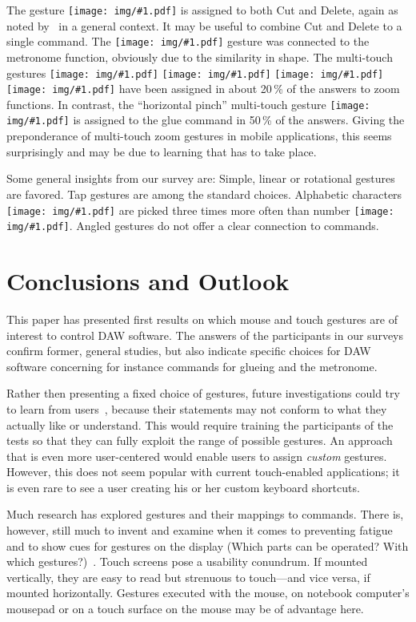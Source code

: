 \documentclass{aes130}
\newcommand{\sixthpic}[1][]{\texttt{[image: img/\#1.pdf]}}
\begin{document}
The gesture \sixthpic[sign-x] is assigned to both Cut and Delete, again as noted by~\cite{Wobbrock:2009:UGS:1518701.1518866} in a general context. It may be useful to combine Cut and Delete to a single command. The \sixthpic[triangle] gesture was connected to the metronome function, obviously due to the similarity in shape. The multi-touch gestures
\sixthpic[multi-pinch-horizontal]
\sixthpic[multi-pinch-vertical]
\sixthpic[multi-spread-horizontal]
\sixthpic[multi-spread-vertical]
have been assigned in about 20\,\%{} of the answers to zoom functions. In contrast, the ``horizontal pinch'' multi-touch gesture \sixthpic[multi-pinch-horizontal] is assigned to the glue command in 50\,\%{} of the answers. Giving the preponderance of multi-touch zoom gestures in mobile applications, this seems surprisingly and may be due to learning that has to take place. 

Some general insights from our survey are: Simple, linear or rotational gestures are favored. Tap gestures are among the standard choices. Alphabetic characters \sixthpic[letters] are picked three times more often than number \sixthpic[digits]. Angled gestures do not offer a clear connection to commands.

\section{Conclusions and Outlook} \label{sec:Conclusions}

This paper has presented first results on which mouse and touch gestures are of interest to control DAW software. The answers of the participants in our surveys confirm former, general studies, but also indicate specific choices for DAW software concerning for instance commands for glueing and the metronome.

Rather then presenting a fixed choice of gestures, future investigations could try to learn from users~\cite{Akers:2007:ODM:1240866.1240868}, because their statements may not conform to what they actually like or understand. This would require training the participants of the tests so that they can fully exploit the range of possible gestures. An approach that is even more user-centered would enable users to assign {\em custom} gestures. However, this does not seem popular with current touch-enabled applications; it is even rare to see a user creating his or her custom keyboard shortcuts.

Much research has explored gestures and their mappings to commands. There is, however, still much to invent and examine when it comes to preventing fatigue and to show cues for gestures on the display (Which parts can be operated? With which gestures?)~\cite{fatigue}. Touch screens pose a usability conundrum. If mounted vertically, they are easy to read but strenuous to touch---and vice versa, if mounted horizontally. Gestures executed with the mouse, on notebook computer's mousepad or on a touch surface on the mouse may be of advantage here.
\end{document}
